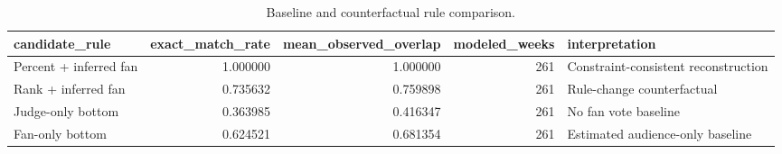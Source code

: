 \begin{table}
\caption{Baseline and counterfactual rule comparison.}
\begin{tabular}{lrrrl}
\toprule
candidate\_rule & exact\_match\_rate & mean\_observed\_overlap & modeled\_weeks & interpretation \\
\midrule
Percent + inferred fan & 1.000000 & 1.000000 & 261 & Constraint-consistent reconstruction \\
Rank + inferred fan & 0.735632 & 0.759898 & 261 & Rule-change counterfactual \\
Judge-only bottom & 0.363985 & 0.416347 & 261 & No fan vote baseline \\
Fan-only bottom & 0.624521 & 0.681354 & 261 & Estimated audience-only baseline \\
\bottomrule
\end{tabular}
\end{table}

